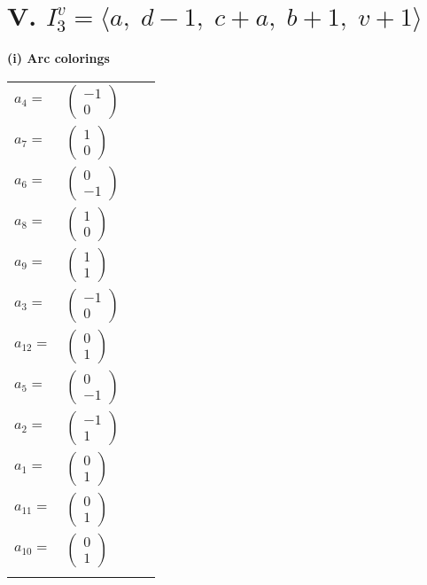\documentclass[1p]{elsarticle_modified}
\theoremstyle{definition}
\begin{document}
\centering \section*{V. $I^v_{3}= \langle a,\;d-1,\;c+a,\;b+1,\;v+1 \rangle$}
\flushleft \textbf{(i) Arc colorings}\\
\begin{tabular}{m{7pt} m{180pt} m{7pt} m{180pt} }
\flushright $a_{4}=$&$\begin{pmatrix}-1\\0\end{pmatrix}$ \\
\flushright $a_{7}=$&$\begin{pmatrix}1\\0\end{pmatrix}$ \\
\flushright $a_{6}=$&$\begin{pmatrix}0\\-1\end{pmatrix}$ \\
\flushright $a_{8}=$&$\begin{pmatrix}1\\0\end{pmatrix}$ \\
\flushright $a_{9}=$&$\begin{pmatrix}1\\1\end{pmatrix}$ \\
\flushright $a_{3}=$&$\begin{pmatrix}-1\\0\end{pmatrix}$ \\
\flushright $a_{12}=$&$\begin{pmatrix}0\\1\end{pmatrix}$ \\
\flushright $a_{5}=$&$\begin{pmatrix}0\\-1\end{pmatrix}$ \\
\flushright $a_{2}=$&$\begin{pmatrix}-1\\1\end{pmatrix}$ \\
\flushright $a_{1}=$&$\begin{pmatrix}0\\1\end{pmatrix}$ \\
\flushright $a_{11}=$&$\begin{pmatrix}0\\1\end{pmatrix}$ \\
\flushright $a_{10}=$&$\begin{pmatrix}0\\1\end{pmatrix}$\\&\end{tabular}
\end{document}
